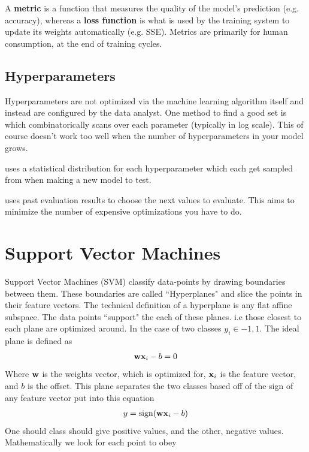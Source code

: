 A \textbf{metric} is a function that measures the quality of the model's prediction (e.g. accuracy), whereas a \textbf{loss function} is what is used by the training system to update its weights automatically (e.g. SSE). Metrics are primarily for human consumption, at the end of training cycles.

\subsection{Hyperparameters}

Hyperparameters are not optimized via the machine learning algorithm itself and instead are configured by the data analyst. One method to find a good set is  which combinatorically scans over each parameter (typically in log scale). This of course doesn't work too well when the number of hyperparameters in your model grows. 

 uses a statistical distribution for each hyperparameter which each get sampled from when making a new model to test.

 uses past evaluation results to choose the next values to evaluate. This aims to minimize the number of expensive optimizations you have to do.





\section{Support Vector Machines}\label{sub:svm}
Support Vector Machines (SVM) classify data-points by drawing boundaries between them. These boundaries are called ``Hyperplanes" and slice the points in their feature vectors. The technical definition of a hyperplane is any flat affine subspace. The data points “support" the each of these planes. i.e those closest to each plane are optimized around. In the case of two classes $y_i \in {-1,1}$. The ideal plane is defined as
\begin{align}
		\textbf{wx}_i-b =0
\end{align}
Where $\textbf{w}$ is the weights vector, which is optimized for, $\textbf{x}_i$ is the feature vector, and $b$ is the offset. This plane separates the two classes based off of the sign of any feature vector put into this equation
\begin{align}
	y = \textrm{sign}(\textbf{wx}_i-b)
\end{align}
One should class should give positive values, and the other, negative values. Mathematically we look for each point to obey

